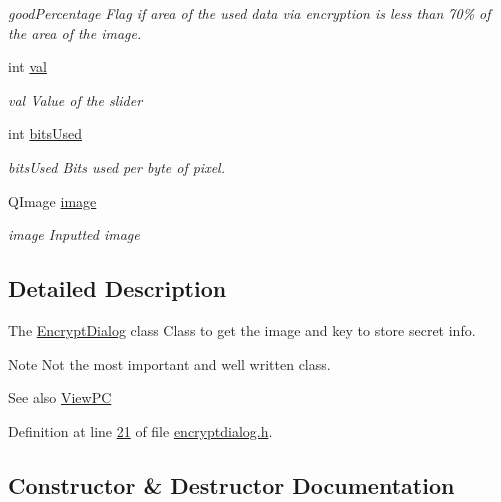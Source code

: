 \begin{DoxyCompactItemize}
\begin{DoxyCompactList}\small\item\em good\+Percentage Flag if area of the used data via encryption is less than 70\% of the area of the image. \end{DoxyCompactList}\item 
int \mbox{\hyperlink{class_encrypt_dialog_a3c9da51b5e9d98d702bcc4ed15405fd5}{val}}
\begin{DoxyCompactList}\small\item\em val Value of the slider \end{DoxyCompactList}\item 
int \mbox{\hyperlink{class_encrypt_dialog_abf638fea37fbdbaba215954e2e239860}{bits\+Used}}
\begin{DoxyCompactList}\small\item\em bits\+Used Bits used per byte of pixel. \end{DoxyCompactList}\item 
Q\+Image \mbox{\hyperlink{class_encrypt_dialog_a739a0df1d28d06b28a3fd16e2bc16c73}{image}}
\begin{DoxyCompactList}\small\item\em image Inputted image \end{DoxyCompactList}\end{DoxyCompactItemize}


\subsection{Detailed Description}
The \mbox{\hyperlink{class_encrypt_dialog}{Encrypt\+Dialog}} class Class to get the image and key to store secret info. 

\begin{DoxyNote}{Note}
Not the most important and well written class. 
\end{DoxyNote}
\begin{DoxySeeAlso}{See also}
\mbox{\hyperlink{class_view_p_c}{View\+PC}} 
\end{DoxySeeAlso}


Definition at line \mbox{\hyperlink{encryptdialog_8h_source_l00021}{21}} of file \mbox{\hyperlink{encryptdialog_8h_source}{encryptdialog.\+h}}.



\subsection{Constructor \& Destructor Documentation}
\mbox{\label{class_encrypt_dialog_ab57e8b3a0d00c977e81f3b356657524e}} 
